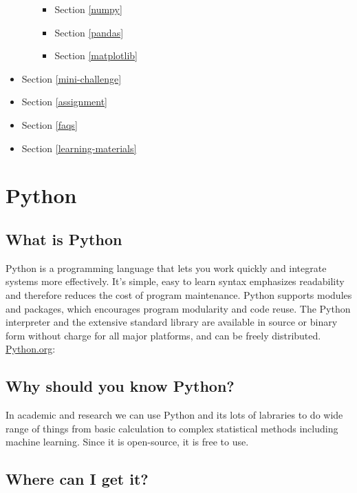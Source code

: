 \documentclass[11pt]{article}
\providecommand{\tightlist}{%
      \setlength{\itemsep}{0pt}\setlength{\parskip}{0pt}}
\begin{document}
\begin{itemize}
\begin{itemize}
    \begin{itemize}
    \tightlist
    \item
      Section \ref{numpy}
    \item
      Section \ref{pandas}
    \item
      Section \ref{matplotlib}
    \end{itemize}
  \end{itemize}
\item
  Section \ref{mini-challenge}
\item
  Section \ref{assignment}
\item
  Section \ref{faqs}
\item
  Section \ref{learning-materials}
\end{itemize}

    \hypertarget{python}{%
\section{Python}\label{python}}

\hypertarget{what-is-python}{%
\subsection{What is Python}\label{what-is-python}}

Python is a programming language that lets you work quickly and
integrate systems more effectively. It's simple, easy to learn syntax
emphasizes readability and therefore reduces the cost of program
maintenance. Python supports modules and packages, which encourages
program modularity and code reuse. The Python interpreter and the
extensive standard library are available in source or binary form
without charge for all major platforms, and can be freely distributed.
\href{https://www.python.org/}{Python.org}:

\hypertarget{why-should-you-know-python}{%
\subsection{Why should you know
Python?}\label{why-should-you-know-python}}

In academic and research we can use Python and its lots of labraries to
do wide range of things from basic calculation to complex statistical
methods including machine learning. Since it is open-source, it is free
to use.

\hypertarget{where-can-i-get-it}{%
\subsection{Where can I get it?}\label{where-can-i-get-it}}
\end{document}
